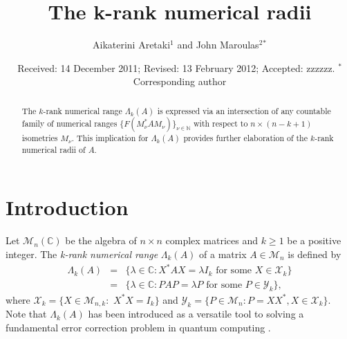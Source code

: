 \documentclass[12pt, reqno]{amsart}
\theoremstyle{definition}
\theoremstyle{remark}
\numberwithin{equation}{section}
\begin{document}
\setcounter{page}{1}




\title[The k-rank numerical radii]{The k-rank numerical radii}

\author[Aik. Aretaki, J. Maroulas]{Aikaterini Aretaki$^1$ and John Maroulas$^2$$^{*}$}

\address{$^{1}$ National Technical University of Athens, Department of Mathematics, Zografou Campus, Athens 15780, Greece.}
\email{\textcolor[rgb]{0.00,0.00,0.84}{kathy@mail.ntua.gr}}

\address{$^{2}$ National Technical University of Athens, Department of Mathematics, Zografou Campus, Athens 15780, Greece.}
\email{\textcolor[rgb]{0.00,0.00,0.84}{maroulas@math.ntua.gr}}




\date{Received: 14 December 2011; Revised: 13 February 2012; Accepted: zzzzzz.
\newline \indent $^{*}$ Corresponding author}

\begin{abstract}
The $k$-rank numerical range $\Lambda_{k}(A)$ is expressed via an inter\-section of any countable family of numerical ranges $\{F(M^{*}_{\nu}AM_{\nu})\}_{\nu\in\mathbb{N}}$ with respect to $n\times (n-k+1)$ isometries $M_{\nu}$. This implication for $\Lambda_{k}(A)$ provides further ela\-boration of the $k$-rank numerical radii of $A$.
\end{abstract} \maketitle

\section{Introduction}\label{intro}

\noindent Let $\mathcal{M}_{n}(\mathbb{C})$ be the algebra of $n\times n$ complex matrices and $k\geq 1$ be a positive integer.
The \emph{k-rank numerical range} $\Lambda_{k}(A)$ of a matrix $A\in\mathcal{M}_{n}$ is defined  by
\begin{eqnarray*}
\nonumber\Lambda_{k}(A) & = & \{\lambda\in\mathbb{C} : X^{*}AX=\lambda I_{k}\,\, \textrm{for}\,\, \textrm{some}\,\, X\in\mathcal{X}_{k}\} \\
 & = & \{\lambda\in\mathbb{C} : PAP=\lambda P\,\, \mathrm{for}\,\, \mathrm{some}\,\, P\in\mathcal{Y}_{k}\},
\end{eqnarray*}
where $\mathcal{X}_{k}=\{X\in\mathcal{M}_{n,k}:\,\,X^{*}X=I_{k}\}$ and $\mathcal{Y}_{k}=\{P\in\mathcal{M}_{n}: P=XX^{*}, X\in\mathcal{X}_{k}\}$. Note that $\Lambda_{k}(A)$ has been introduced  as a versatile tool to solving a fundamental error correction problem in quantum computing \cite{Aretaki,Aret,Poon-Li-Sze,Li-Sze,Hugo}.
\end{document}
